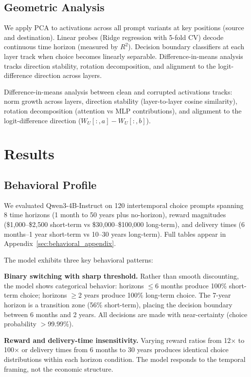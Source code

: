 \documentclass{article}
\begin{document}
\subsection{Geometric Analysis}

We apply PCA to activations across all prompt variants at key positions (source and destination). Linear probes (Ridge regression with 5-fold CV) decode continuous time horizon (measured by $R^2$). Decision boundary classifiers at each layer track when choice becomes linearly separable. Difference-in-means analysis tracks direction stability, rotation decomposition, and alignment to the logit-difference direction across layers.

Difference-in-means analysis between clean and corrupted activations tracks: norm growth across layers, direction stability (layer-to-layer cosine similarity), rotation decomposition (attention vs MLP contributions), and alignment to the logit-difference direction ($W_U[:, a] - W_U[:, b]$).

\section{Results}

\subsection{Behavioral Profile}

We evaluated Qwen3-4B-Instruct on 120 intertemporal choice prompts spanning 8 time horizons (1 month to 50 years plus no-horizon), reward magnitudes (\$1,000--\$2,500 short-term vs \$30,000--\$100,000 long-term), and delivery times (6 months--1 year short-term vs 10--30 years long-term). Full tables appear in Appendix~\ref{sec:behavioral_appendix}.

The model exhibits three key behavioral patterns:

\textbf{Binary switching with sharp threshold.} Rather than smooth discounting, the model shows categorical behavior: horizons $\leq$6 months produce 100\% short-term choice; horizons $\geq$2 years produce 100\% long-term choice. The 7-year horizon is a transition zone (56\% short-term), placing the decision boundary between 6 months and 2 years. All decisions are made with near-certainty (choice probability $>$99.99\%).

\textbf{Reward and delivery-time insensitivity.} Varying reward ratios from 12$\times$ to 100$\times$ or delivery times from 6 months to 30 years produces identical choice distributions within each horizon condition. The model responds to the temporal framing, not the economic structure.
\end{document}
